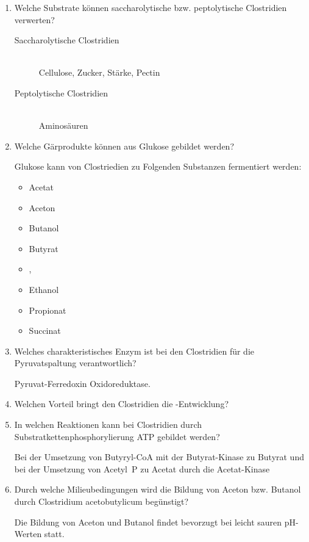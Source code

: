 \begin{enumerate}
	\item Welche Substrate können saccharolytische bzw. peptolytische Clostridien verwerten?

		\begin{description}
			\item[Saccharolytische Clostridien] \hfill \\
				Cellulose, Zucker, Stärke, Pectin
			\item[Peptolytische Clostridien] \hfill \\
				Aminosäuren
		\end{description}

	\item Welche Gärprodukte können aus Glukose gebildet werden?
		
		Glukose kann von Clostriedien zu Folgenden Substanzen fermentiert werden:
		\begin{itemize}
			\item Acetat
			\item Aceton
			\item Butanol
			\item Butyrat
			\item {}, 
			\item Ethanol
			\item Propionat
			\item Succinat
		\end{itemize}

	\item Welches charakteristisches Enzym ist bei den Clostridien für die Pyruvatspaltung verantwortlich?

		Pyruvat-Ferredoxin Oxidoreduktase.

	\item Welchen Vorteil bringt den Clostridien die -Entwicklung?
	\item In welchen Reaktionen kann bei Clostridien durch Substratkettenphosphorylierung ATP gebildet werden?

		Bei der Umsetzung von Butyryl-CoA mit der Butyrat-Kinase zu Butyrat und
		bei der Umsetzung von Acetyl~P zu Acetat durch die Acetat-Kinase

	\item Durch welche Milieubedingungen wird die Bildung von Aceton bzw. Butanol durch Clostridium acetobutylicum begünstigt?

		Die Bildung von Aceton und Butanol findet bevorzugt bei leicht sauren pH-Werten statt.


\end{enumerate}

